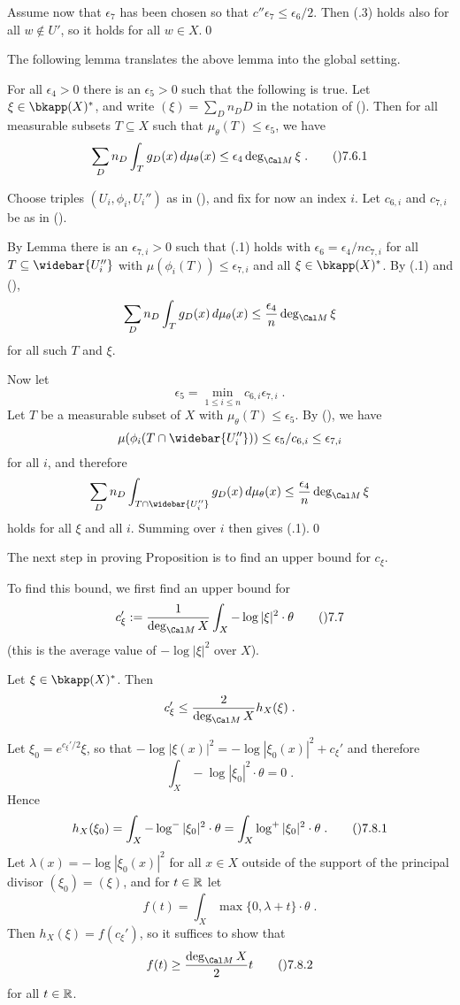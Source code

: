 Assume now that $\epsilon_7$ has been chosen so that
$c''\epsilon_7\le\epsilon_6/2$.  Then (.3) holds also
for all $w\notin U'$, so it holds for all $w\in X$.\qed
\enddemo

The following lemma translates the above lemma into the global setting.

For all $\epsilon_4>0$ there is an $\epsilon_5>0$ such that the following
is true.  Let $\xi\in\bkapp(X)^{*}$, and write $(\xi)=\sum_D n_D D$
in the notation of ().  Then for all measurable subsets
$T\subseteq X$ such that $\mu_\theta(T)\le\epsilon_5$, we have
$$\sum_D n_D \int_T g_D(x)\,d\mu_\theta(x) \le \epsilon_4\deg_{\Cal M} \xi\;.
  \tag\07.6.1$$
\endit

  Choose triples $(U_i,\phi_i,U_i'')$ as in (),
and fix for now an index $i$.  Let $c_{6,i}$ and $c_{7,i}$ be as in ().

By Lemma  there is an $\epsilon_{7,i}>0$ such that (.1) holds
with $\epsilon_6=\epsilon_4/nc_{7,i}$ for all $T\subseteq \widebar{U_i''}$
with $\mu(\phi_i(T))\le\epsilon_{7,i}$ and all $\xi\in\bkapp(X)^{*}$.
By (.1) and (),
$$\sum_D n_D \int_T g_D(x)\,d\mu_\theta(x)
  \le \frac{\epsilon_4}{n}\deg_{\Cal M} \xi$$
for all such $T$ and $\xi$.

Now let
$$\epsilon_5 = \min_{1\le i\le n} c_{6,i}\epsilon_{7,i}\;.$$
Let $T$ be a measurable subset of $X$ with $\mu_\theta(T)\le\epsilon_5$.
By (), we have
$$\mu(\phi_i(T\cap\widebar{U_i''})) \le \epsilon_5/c_{6,i} \le \epsilon_{7,i}$$
for all $i$, and therefore
$$\sum_D n_D \int_{T\cap\widebar{U_i''}} g_D(x)\,d\mu_\theta(x)
  \le \frac{\epsilon_4}{n}\deg_{\Cal M} \xi$$
holds for all $\xi$ and all $i$.  Summing over $i$ then gives (.1).\qed
\enddemo

The next step in proving Proposition  is to find an upper bound
for $c_\xi$.

To find this bound, we first find an upper bound for
$$c_\xi' := \frac1{\deg_{\Cal M} X}\int_X -\log|\xi|^2\cdot\theta\tag\07.7$$
(this is the average value of $-\log|\xi|^2$ over $X$).

  Let $\xi\in\bkapp(X)^{*}$.  Then
$$c_\xi' \le \frac2{\deg_{\Cal M} X}h_X(\xi)\;.$$
\endit

  Let $\xi_0 = e^{c_\xi'/2}\xi$, so that
$-\log|\xi(x)|^2 = -\log|\xi_0(x)|^2 + c_\xi'$ and therefore
$$\int_X -\log|\xi_0|^2\cdot\theta = 0\;.$$
Hence
$$h_X(\xi_0) = \int_X -\log^{-}|\xi_0|^2\cdot\theta
  = \int_X \log^{+}|\xi_0|^2\cdot\theta\;.\tag\07.8.1$$
Let $\lambda(x)=-\log|\xi_0(x)|^2$ for all $x\in X$ outside of the support of
the principal divisor $(\xi_0)=(\xi)$, and for $t\in\Bbb R$ let
$$f(t) = \int_X \max\{0,\lambda+t\}\cdot\theta\;.$$
Then $h_X(\xi)=f(c_\xi')$, so it suffices to show that
$$f(t) \ge \frac{\deg_{\Cal M} X}{2}t\tag\07.8.2$$
for all $t\in\Bbb R$.

